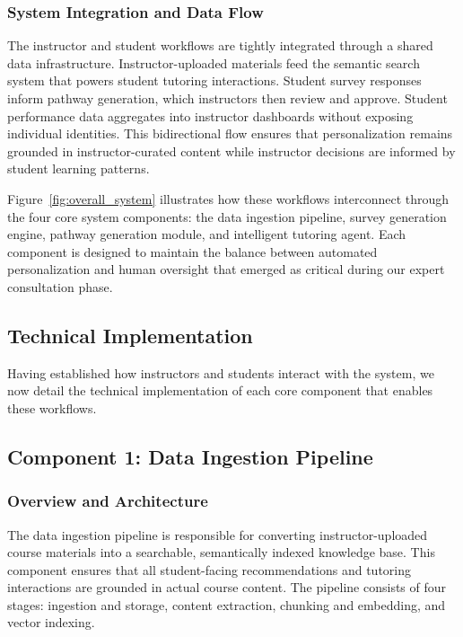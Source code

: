 \documentclass{stylefiles/capstone}
\begin{document}
\subsubsection{System Integration and Data Flow}

The instructor and student workflows are tightly integrated through a shared data infrastructure. Instructor-uploaded materials feed the semantic search system that powers student tutoring interactions. Student survey responses inform pathway generation, which instructors then review and approve. Student performance data aggregates into instructor dashboards without exposing individual identities. This bidirectional flow ensures that personalization remains grounded in instructor-curated content while instructor decisions are informed by student learning patterns.
 
Figure~\ref{fig:overall_system} illustrates how these workflows interconnect through the four core system components: the data ingestion pipeline, survey generation engine, pathway generation module, and intelligent tutoring agent. Each component is designed to maintain the balance between automated personalization and human oversight that emerged as critical during our expert consultation phase.

\subsection{Technical Implementation}

Having established how instructors and students interact with the system, we now detail the technical implementation of each core component that enables these workflows.

\subsection{Component 1: Data Ingestion Pipeline}
\label{sec:data_pipeline}

\subsubsection{Overview and Architecture}

The data ingestion pipeline is responsible for converting instructor-uploaded course materials into a searchable, semantically indexed knowledge base. This component ensures that all student-facing recommendations and tutoring interactions are grounded in actual course content. The pipeline consists of four stages: ingestion and storage, content extraction, chunking and embedding, and vector indexing.
\end{document}
